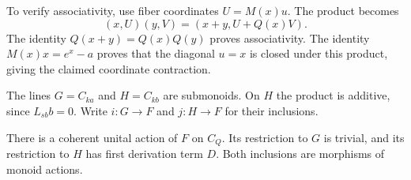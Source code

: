 To verify associativity, use fiber coordinates
$U=M(x)u$. The product becomes
\[
 (x,U)(y,V)=(x+y,U+Q(x)V).
\]
The identity $Q(x+y)=Q(x)Q(y)$ proves associativity.
The identity $M(x)x=e^x-a$ proves that the diagonal
$u=x$ is closed under this product, giving the claimed
coordinate contraction.

The lines $G=C_{ka}$ and $H=C_{kb}$ are submonoids.
On $H$ the product is additive, since $L_{sb}b=0$.
Write $i:G\to F$ and $j:H\to F$ for their inclusions.

\begin{lemma}\label{mht:lem:relative-derivation-actor}
There is a coherent unital action of $F$ on $C_Q$.
Its restriction to $G$ is trivial, and its restriction
to $H$ has first derivation term $D$.
Both inclusions are morphisms of monoid actions.
\end{lemma}

